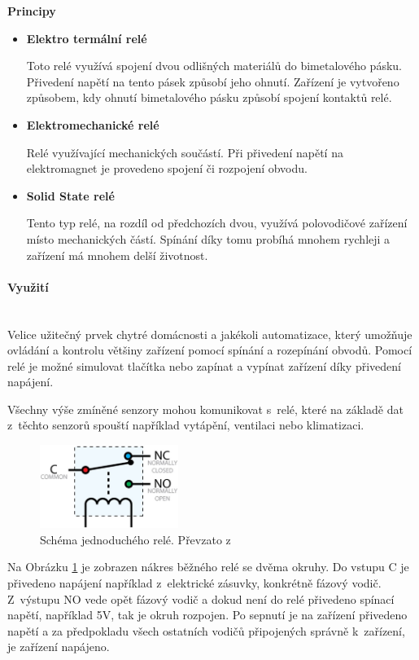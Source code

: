 \noindent\textbf{Principy}
\begin{itemize}
  \item \textbf{Elektro termální relé}
  
  Toto relé využívá spojení dvou odlišných materiálů do bimetalového pásku. Přivedení napětí na tento pásek způsobí jeho ohnutí. Zařízení je vytvořeno způsobem, kdy ohnutí bimetalového pásku způsobí spojení kontaktů relé.
  \item \textbf{Elektromechanické relé}
  
  Relé využívající mechanických součástí. Při přivedení napětí na elektromagnet je provedeno spojení či rozpojení obvodu.
  \item \textbf{Solid State relé}
  
  Tento typ relé, na rozdíl od předchozích dvou, využívá polovodičové zařízení místo mechanických částí. Spínání díky tomu probíhá mnohem rychleji a zařízení má mnohem delší životnost. 
  \end{itemize}

\paragraph*{Využití}\mbox{} \\
Velice užitečný prvek chytré domácnosti a jakékoli automatizace, který umožňuje ovládání a kontrolu většiny zařízení pomocí spínání a rozepínání obvodů. Pomocí relé je možné simulovat tlačítka nebo zapínat a vypínat zařízení díky přivedení napájení. 

Všechny výše zmíněné senzory mohou komunikovat s~relé, které na základě dat z~těchto senzorů spouští například vytápění, ventilaci nebo klimatizaci.

\begin{figure}[H]
  \centering
  \includegraphics[width=0.4\textwidth]{obrazky-figures/hardwareComponents/relayDiagram.jpg}
  \caption{Schéma jednoduchého relé. Převzato z~\cite{Rele}}
  \label{relayDiagram}
\end{figure}

Na Obrázku \ref{relayDiagram} je zobrazen nákres běžného relé se dvěma okruhy. Do vstupu C je přivedeno napájení například z~elektrické zásuvky, konkrétně fázový vodič. Z~výstupu NO vede opět fázový vodič a dokud není do relé přivedeno spínací napětí, například 5V, tak je okruh rozpojen. Po sepnutí je na zařízení přivedeno napětí a za předpokladu všech ostatních vodičů připojených správně k~zařízení, je zařízení napájeno.

